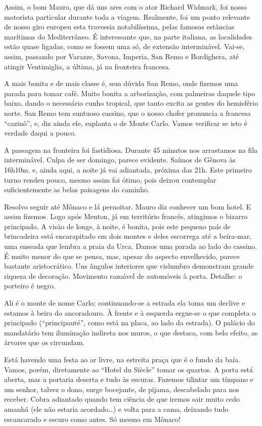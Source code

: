Assim, o bom Mauro, que dá uns ares com o ator Richard Widmark, foi nosso motorista particular durante toda a viagem. Realmente, foi um ponto relevante de nosso giro europeu esta travessia notabilíssima, pelas famosas estâncias marítimas do Mediterrâneo. É interessante que, na parte italiana, as localidades estão quase ligadas, como se fossem uma só, de extensão interminável. Vai-se, assim, passando por Varazze, Savona, Imperia, San Remo e Bordighera, até atingir Ventimiglia, a última, já na fronteira francesa.

A mais bonita e de mais classe é, sem dúvida San Remo, onde fizemos uma parada para tomar café. Muito bonita a arborização, com palmeiras daquele tipo baixo, dando o necessário cunho tropical, que tanto excita as gentes do hemisfério norte. San Remo tem suntuoso cassino, que o nosso chofer pronuncia a francesa ``cazinô'', e, diz ainda ele, suplanta o de Monte Carlo. Vamos verificar se isto é verdade daqui a pouco.

A passagem na fronteira foi fastidiosa. Durante 45 minutos nos arrastamos na fila interminável. Culpa de ser domingo, parece evidente. Saímos de Gênova às 16h10m. e, ainda aqui, a noite já vai adiantada, próxima das 21h. Este primeiro turno rendeu pouco, mesmo assim foi ótimo, pois deixou contemplar suficientemente as belas paisagens do caminho.

Resolvo seguir até Mônaco e lá pernoitar. Mauro diz conhecer um bom hotel. E assim fizemos. Logo após Menton, já em território francês, atingimos o bizarro principado. A visão de longe, à noite, é bonita, pois este pequeno país de brincadeira está encarapitado em dois montes e deles escorrega até a beira-mar, uma enseada que lembra a praia da Urca. Damos uma parada ao lado do cassino. É muito menor do que se pensa, mas, apesar do aspecto envelhecido, parece bastante aristocrático. Uns ângulos interiores que vislumbro demonstram grande riqueza de decoração. Movimento razoável de automóveis à porta. Detalhe: o porteiro é negro.

Ali é o monte de nome Carlo; continuando-se a estrada ela toma um declive e estamos à beira do ancoradouro. À frente e à esquerda ergue-se o que completa o principado (``principauté'', como está na placa, ao lado da estrada). O palácio do mandatário tem iluminação indireta nos muros, o que destaca, com belo efeito, as árvores que os circundam.

Está havendo uma festa ao ar livre, na estreita praça que é o fundo da baía. Vamos, porém, diretamente ao ``Hotel du Siècle'' tomar os quartos. A porta está aberta, mas a portaria deserta e tudo às escuras. Fazemos tilintar um tímpano e um senhor, talvez o dono, surge bocejante, de pijama, descabelado para nos receber. Cobra adiantado quando tem ciência de que iremos sair muito cedo amanhã (ele não estaria acordado\ldots) e volta para a cama, deixando tudo escancarado e escuro como antes. Só mesmo em Mônaco!

